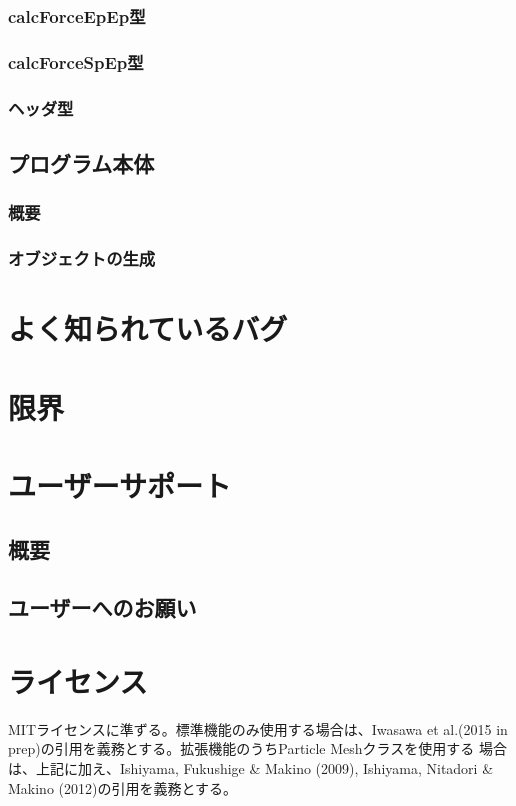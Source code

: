 \documentclass[12pt,a4paper]{jarticle}
\begin{document}
\subsubsection{calcForceEpEp型}

\subsubsection{calcForceSpEp型}

\subsubsection{ヘッダ型}

\subsection{プログラム本体}

\subsubsection{概要}

\subsubsection{オブジェクトの生成}

\newpage

\section{よく知られているバグ}


\newpage

\section{限界}

\newpage

\section{ユーザーサポート}

\subsection{概要}

\subsection{ユーザーへのお願い}

\newpage

\section{ライセンス}

MITライセンスに準ずる。標準機能のみ使用する場合は、Iwasawa et al.(2015
in prep)の引用を義務とする。拡張機能のうちParticle Meshクラスを使用する
場合は、上記に加え、Ishiyama, Fukushige \& Makino (2009), Ishiyama,
Nitadori \& Makino (2012)の引用を義務とする。
\end{document}
